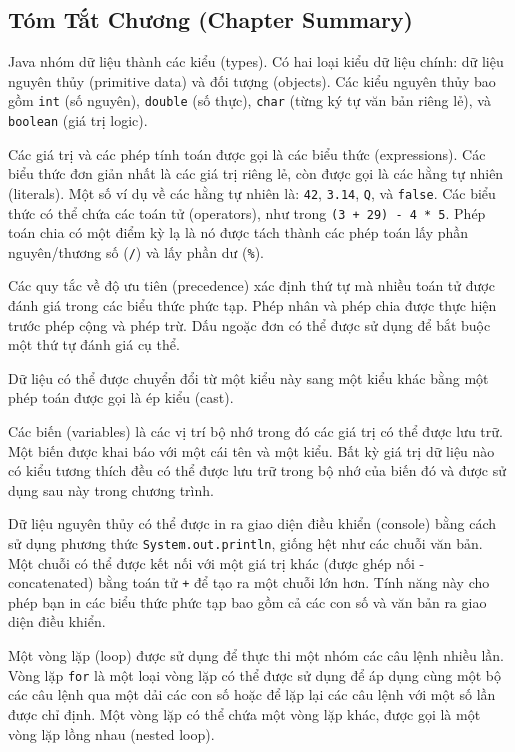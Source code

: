 \subsection{Tóm Tắt Chương (Chapter
Summary)}\label{tuxf3m-tux1eaft-chux1b0ux1a1ng-chapter-summary}

Java nhóm dữ liệu thành các kiểu (types). Có hai loại kiểu dữ liệu
chính: dữ liệu nguyên thủy (primitive data) và đối tượng (objects). Các
kiểu nguyên thủy bao gồm \texttt{int} (số nguyên), \texttt{double} (số
thực), \texttt{char} (từng ký tự văn bản riêng lẻ), và \texttt{boolean}
(giá trị logic).

Các giá trị và các phép tính toán được gọi là các biểu thức
(expressions). Các biểu thức đơn giản nhất là các giá trị riêng lẻ, còn
được gọi là các hằng tự nhiên (literals). Một số ví dụ về các hằng tự
nhiên là: \texttt{42}, \texttt{3.14},
\texttt{\textquotesingle{}Q\textquotesingle{}}, và \texttt{false}. Các
biểu thức có thể chứa các toán tử (operators), như trong
\texttt{(3\ +\ 29)\ -\ 4\ *\ 5}. Phép toán chia có một điểm kỳ lạ là nó
được tách thành các phép toán lấy phần nguyên/thương số (\texttt{/}) và
lấy phần dư (\texttt{\%}).

Các quy tắc về độ ưu tiên (precedence) xác định thứ tự mà nhiều toán tử
được đánh giá trong các biểu thức phức tạp. Phép nhân và phép chia được
thực hiện trước phép cộng và phép trừ. Dấu ngoặc đơn có thể được sử dụng
để bắt buộc một thứ tự đánh giá cụ thể.

Dữ liệu có thể được chuyển đổi từ một kiểu này sang một kiểu khác bằng
một phép toán được gọi là ép kiểu (cast).

Các biến (variables) là các vị trí bộ nhớ trong đó các giá trị có thể
được lưu trữ. Một biến được khai báo với một cái tên và một kiểu. Bất kỳ
giá trị dữ liệu nào có kiểu tương thích đều có thể được lưu trữ trong bộ
nhớ của biến đó và được sử dụng sau này trong chương trình.

Dữ liệu nguyên thủy có thể được in ra giao diện điều khiển (console)
bằng cách sử dụng phương thức \texttt{System.out.println}, giống hệt như
các chuỗi văn bản. Một chuỗi có thể được kết nối với một giá trị khác
(được ghép nối - concatenated) bằng toán tử \texttt{+} để tạo ra một
chuỗi lớn hơn. Tính năng này cho phép bạn in các biểu thức phức tạp bao
gồm cả các con số và văn bản ra giao diện điều khiển.

Một vòng lặp (loop) được sử dụng để thực thi một nhóm các câu lệnh nhiều
lần. Vòng lặp \texttt{for} là một loại vòng lặp có thể được sử dụng để
áp dụng cùng một bộ các câu lệnh qua một dải các con số hoặc để lặp lại
các câu lệnh với một số lần được chỉ định. Một vòng lặp có thể chứa một
vòng lặp khác, được gọi là một vòng lặp lồng nhau (nested loop).

